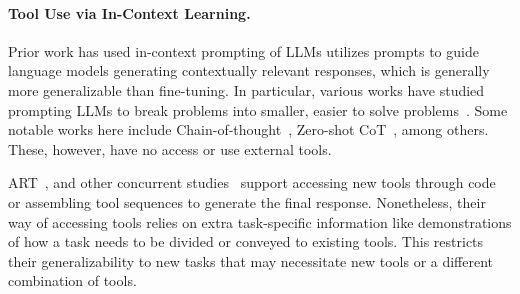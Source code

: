 \documentclass[11pt]{article}
\newcommand{\danielchange}[2]{{\color{red}{\st{#1}}{#2}}}
\begin{document}
\paragraph{Tool Use via In-Context Learning.} 
Prior work has used in-context prompting of LLMs utilizes prompts to guide language models generating contextually relevant responses, which is generally more generalizable than fine-tuning. In particular, various works have studied prompting LLMs to break problems into smaller, easier to solve problems~\citep{zhou2022least,dua2022successive,khot2022decomposed}. Some notable works here include Chain-of-thought~\citep{wei2022chain}, Zero-shot CoT~\citep{kojima2022large}, among others. These, however, have no access or use external tools. 

ART~\citep{paranjape2023art}, and other concurrent studies~\citep{lu2023chameleon,qian2023creator} support accessing new tools through code or assembling tool sequences to generate the final response. 
Nonetheless, their way of accessing tools relies on extra task-specific information like demonstrations of how a task needs to be divided or conveyed to existing tools. This restricts their generalizability to new tasks that may necessitate new tools or a different combination of tools.
\end{document}
